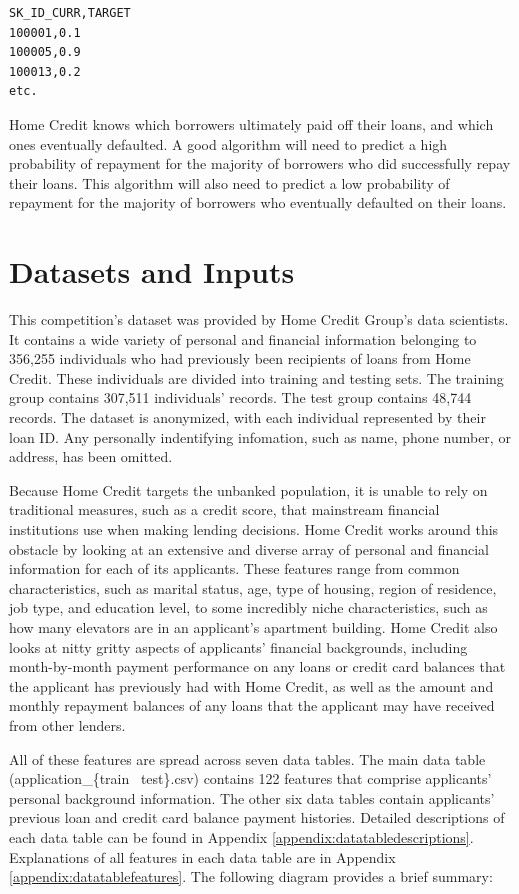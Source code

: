 \documentclass[12pt, letterpaper]{article}
\begin{document}
\begin{lstlisting}
SK_ID_CURR,TARGET
100001,0.1
100005,0.9
100013,0.2
etc.
\end{lstlisting}

Home Credit knows which borrowers ultimately paid off their loans, and which ones eventually defaulted. A good algorithm will need to predict a high probability of repayment for the majority of borrowers who did successfully repay their loans. This algorithm will also need to predict a low probability of repayment for the majority of borrowers who eventually defaulted on their loans.

\section{Datasets and Inputs}
This competition's dataset was provided by Home Credit Group's data scientists. It contains a wide variety of personal and financial information belonging to 356,255 individuals who had previously been recipients of loans from Home Credit. These individuals are divided into training and testing sets. The training group contains 307,511 individuals' records. The test group contains 48,744 records. The dataset is anonymized, with each individual represented by their loan ID. Any personally indentifying infomation, such as name, phone number, or address, has been omitted.

Because Home Credit targets the unbanked population, it is unable to rely on traditional measures, such as a credit score, that mainstream financial institutions use when making lending decisions. Home Credit works around this obstacle by looking at an extensive and diverse array of personal and financial information for each of its applicants. These features range from common characteristics, such as marital status, age, type of housing, region of residence, job type, and education level, to some incredibly niche characteristics, such as how many elevators are in an applicant's apartment building. Home Credit also looks at nitty gritty aspects of applicants' financial backgrounds, including month-by-month payment performance on any loans or credit card balances that the applicant has previously had with Home Credit, as well as the amount and monthly repayment balances of any loans that the applicant may have received from other lenders.

All of these features are spread across seven data tables. The main data table (application_\{train \textbar~test\}.csv) contains 122 features that comprise applicants' personal background information. The other six data tables contain applicants' previous loan and credit card balance payment histories. Detailed descriptions of each data table can be found in Appendix \ref{appendix:datatabledescriptions}. Explanations of all features in each data table are in Appendix \ref{appendix:datatablefeatures}. The following diagram provides a brief summary:
\end{document}
